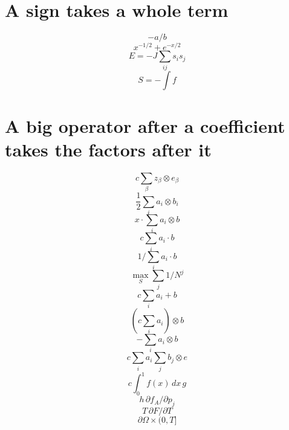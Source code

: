 \documentclass{article}
\begin{document}
\section{A sign takes a whole term}
\[ -a/b \]
\[ x^{-1/2} + e^{-x/2} \]
\[ E = -J\sum_{ij} s_i s_j \]
\[ S = -\int f \]

\section{A big operator after a coefficient takes the factors after it}
\[ c\sum_\beta z_\beta\otimes e_\beta \]
\[ \frac12\sum_i a_i\otimes b_i \]
\[ x\cdot\sum_i a_i\otimes b \]
\[ c\sum_i a_i\cdot b \]
\[ 1/\sum_i a_i\cdot b \]
\[ \max_S\sum_j 1/N^j \]
\[ c\sum_i a_i + b \]
\[ (c\sum_i a_i)\otimes b \]
\[ -\sum_i a_i\otimes b \]
\[ c\sum_i a_i\sum_j b_j\otimes e \]
\[ c\int_0^1 f(x)\,dx\,g \]
\[ h\,\partial f_{A}/\partial p_{j} \]
\[ T\,\partial F/\partial T \]
\[ \partial\Omega\times(0,T] \]
\end{document}
